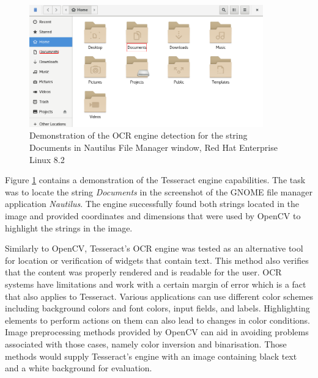 \begin{figure}[H]
	\centering
	\includegraphics[width=0.9\textwidth]{obrazky-figures/ocr+nautilus.png}
	\caption{Demonstration of the OCR engine detection for the string Documents in Nautilus File Manager window, Red Hat Enterprise Linux 8.2}
	\label{ocr_nautilus}
\end{figure}

Figure \ref{ocr_nautilus} contains a demonstration of the Tesseract engine capabilities. The task was to locate the string \textit{Documents} in the screenshot of the GNOME file manager application \textit{Nautilus}.
The engine successfully found both strings located in the image and provided coordinates and dimensions that were used by OpenCV to highlight the strings in the image. 

Similarly to OpenCV, Tesseract's OCR engine was tested as an alternative tool for location or verification of widgets that contain text. This method also verifies that the content was properly rendered and is readable for the user. OCR systems have limitations and work with a certain margin of error which is a fact that also applies to Tesseract. Various applications can use different color schemes including background colors and font colors, input fields, and labels. Highlighting elements to perform actions on them can also lead to changes in color conditions. Image preprocessing methods provided by OpenCV can aid in avoiding problems associated with those cases, namely color inversion and binarisation. Those methods would supply Tesseract's engine with an image containing black text and a white background for evaluation.

